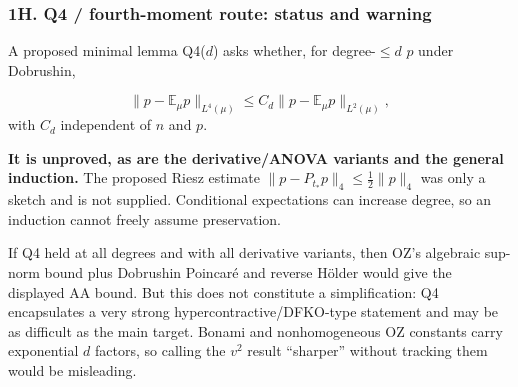 \subsubsection{1H. Q4 / fourth-moment route: status and warning}\label{h.-q4-fourth-moment-route-status-and-warning}

A proposed minimal lemma Q4(\(d\)) asks whether, for degree-\(\le d\) \(p\) under Dobrushin,

\[\|p-\mathbb E_\mu p\|_{L^4(\mu)}
\le C_d\|p-\mathbb E_\mu p\|_{L^2(\mu)},\]
with \(C_d\) independent of \(n\) and \(p\).

\textbf{It is unproved, as are the derivative/ANOVA variants and the general induction.} The proposed Riesz estimate \(\|p-P_{t_*}p\|_4\le\frac12\|p\|_4\) was only a sketch and is not supplied. Conditional expectations can increase degree, so an induction cannot freely assume preservation.

If Q4 held at all degrees and with all derivative variants, then OZ's algebraic sup-norm bound plus Dobrushin Poincaré and reverse Hölder would give the displayed AA bound. But this does not constitute a simplification: Q4 encapsulates a very strong hypercontractive/DFKO-type statement and may be as difficult as the main target. Bonami and nonhomogeneous OZ constants carry exponential \(d\) factors, so calling the \(v^2\) result ``sharper'' without tracking them would be misleading.
